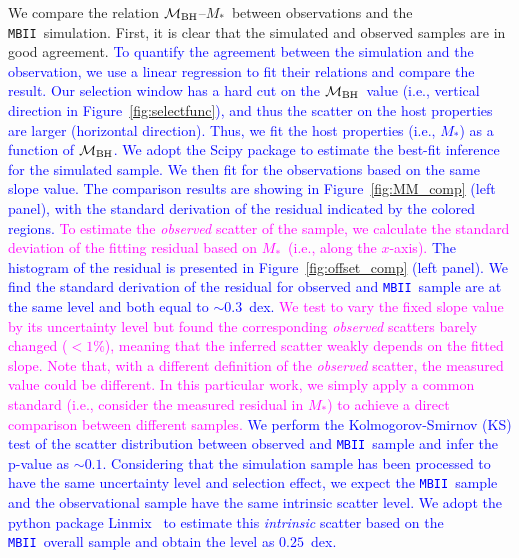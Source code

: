 \documentclass[twocolumn,trackchanges]{aastex63}
\newcommand{\mbh}{$\mathcal M_{\rm BH}$}
\newcommand{\mstar}{{$M_*$}}
\newcommand{\mbii}{\texttt{MBII}}
\newcommand{\blue}[1]{{ \textcolor{blue}{#1}}}
\newcommand{\pink}[1]{{ \textcolor{magenta}{#1}}}
\begin{document}
We compare the relation \mbh--\mstar~between observations and the \mbii\ simulation. First, it is clear that the simulated and observed samples are in good agreement. 
\blue{To quantify the agreement between the simulation and the observation, we use a linear regression to fit their relations and compare the result. Our selection window has a hard cut on the \mbh\ value (i.e., vertical direction in Figure~\ref{fig:selectfunc}), and thus the scatter on the host properties are larger (horizontal direction). Thus, we fit the host properties (i.e., \mstar) as a function of \mbh. We adopt the {\sc Scipy} package to estimate the best-fit inference for the simulated sample. We then fit for the observations based on the same slope value. The comparison results are showing in Figure~\ref{fig:MM_comp} (left panel), with the standard derivation of the residual indicated by the colored regions.}
\pink{To estimate the {\it observed} scatter of the sample, we calculate the standard deviation of the fitting residual based on \mstar\ (i.e., along the $x$-axis).}\blue{The histogram of the residual is presented in Figure~\ref{fig:offset_comp} (left panel). We find the standard derivation of the residual for observed and \mbii\ sample are at the same level and both equal to $\sim0.3$~dex.}\pink{We test to vary the fixed slope value by its uncertainty level but found the corresponding {\it observed} scatters barely changed ($<1\%$), meaning that the inferred scatter weakly depends on the fitted slope. Note that, with a different definition of the {\it observed} scatter, the measured value could be different. In this particular work, we simply apply a common standard (i.e., consider the measured residual in \mstar) to achieve a direct comparison between different samples.}\blue{We perform the Kolmogorov-Smirnov (KS) test of the scatter distribution between observed and \mbii\ sample and infer the p-value as $\sim0.1$. Considering that the simulation sample has been processed to have the same uncertainty level and selection effect, we expect the \mbii\ sample and the observational sample have the same intrinsic scatter level. We adopt the python package {\sc Linmix}~\citep{Kelly2007} to estimate this {\it intrinsic} scatter based on the \mbii\ overall sample and obtain the level as $0.25$~dex.
}
\end{document}

